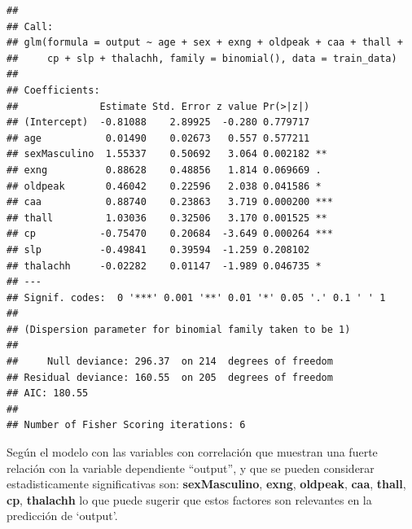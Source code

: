 \documentclass[
]{article}
\newenvironment{Shaded}{\begin{snugshade}}{\end{snugshade}}
\newcommand{\AttributeTok}[1]{\textcolor[rgb]{0.13,0.29,0.53}{#1}}
\newcommand{\CommentTok}[1]{\textcolor[rgb]{0.56,0.35,0.01}{\textit{#1}}}
\newcommand{\DecValTok}[1]{\textcolor[rgb]{0.00,0.00,0.81}{#1}}
\newcommand{\FloatTok}[1]{\textcolor[rgb]{0.00,0.00,0.81}{#1}}
\newcommand{\FunctionTok}[1]{\textcolor[rgb]{0.13,0.29,0.53}{\textbf{#1}}}
\newcommand{\NormalTok}[1]{#1}
\newcommand{\OtherTok}[1]{\textcolor[rgb]{0.56,0.35,0.01}{#1}}
\newcommand{\SpecialCharTok}[1]{\textcolor[rgb]{0.81,0.36,0.00}{\textbf{#1}}}
\begin{document}
\begin{Shaded}
\end{Shaded}

\begin{verbatim}
## 
## Call:
## glm(formula = output ~ age + sex + exng + oldpeak + caa + thall + 
##     cp + slp + thalachh, family = binomial(), data = train_data)
## 
## Coefficients:
##              Estimate Std. Error z value Pr(>|z|)    
## (Intercept)  -0.81088    2.89925  -0.280 0.779717    
## age           0.01490    0.02673   0.557 0.577211    
## sexMasculino  1.55337    0.50692   3.064 0.002182 ** 
## exng          0.88628    0.48856   1.814 0.069669 .  
## oldpeak       0.46042    0.22596   2.038 0.041586 *  
## caa           0.88740    0.23863   3.719 0.000200 ***
## thall         1.03036    0.32506   3.170 0.001525 ** 
## cp           -0.75470    0.20684  -3.649 0.000264 ***
## slp          -0.49841    0.39594  -1.259 0.208102    
## thalachh     -0.02282    0.01147  -1.989 0.046735 *  
## ---
## Signif. codes:  0 '***' 0.001 '**' 0.01 '*' 0.05 '.' 0.1 ' ' 1
## 
## (Dispersion parameter for binomial family taken to be 1)
## 
##     Null deviance: 296.37  on 214  degrees of freedom
## Residual deviance: 160.55  on 205  degrees of freedom
## AIC: 180.55
## 
## Number of Fisher Scoring iterations: 6
\end{verbatim}

Según el modelo con las variables con correlación que muestran una
fuerte relación con la variable dependiente ``output'', y que se pueden
considerar estadisticamente significativas son: \textbf{sexMasculino},
\textbf{exng}, \textbf{oldpeak}, \textbf{caa}, \textbf{thall},
\textbf{cp}, \textbf{thalachh} lo que puede sugerir que estos factores
son relevantes en la predicción de `output'.
\end{document}
